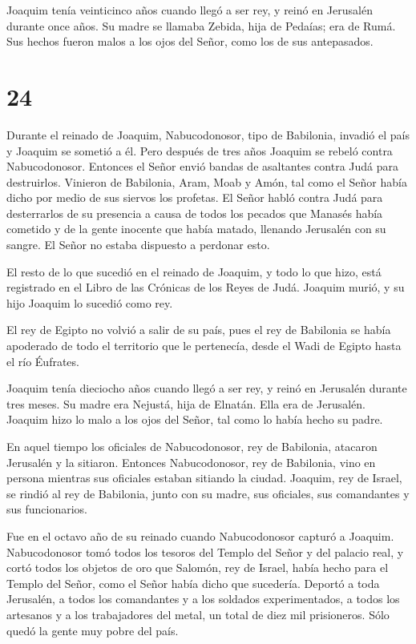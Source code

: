  Joaquim tenía veinticinco años cuando llegó a ser rey, y
reinó en Jerusalén durante once años. Su madre se llamaba Zebida, hija
de Pedaías; era de Rumá.  Sus hechos fueron malos a los
ojos del Señor, como los de sus antepasados.

\hypertarget{section-23}{%
\section{24}\label{section-23}}

 Durante el reinado de Joaquim, Nabucodonosor, tipo de
Babilonia, invadió el país y Joaquim se sometió a él. Pero después de
tres años Joaquim se rebeló contra Nabucodonosor.  Entonces
el Señor envió bandas de asaltantes contra Judá para destruirlos.
Vinieron de Babilonia, Aram, Moab y Amón, tal como el Señor había dicho
por medio de sus siervos los profetas.  El Señor habló
contra Judá para desterrarlos de su presencia a causa de todos los
pecados que Manasés había cometido y de la gente inocente que había
matado,  llenando Jerusalén con su sangre. El Señor no
estaba dispuesto a perdonar esto.

 El resto de lo que sucedió en el reinado de Joaquim, y todo
lo que hizo, está registrado en el Libro de las Crónicas de los Reyes de
Judá.  Joaquim murió, y su hijo Joaquim lo sucedió como rey.

 El rey de Egipto no volvió a salir de su país, pues el rey
de Babilonia se había apoderado de todo el territorio que le pertenecía,
desde el Wadi de Egipto hasta el río Éufrates.

 Joaquim tenía dieciocho años cuando llegó a ser rey, y
reinó en Jerusalén durante tres meses. Su madre era Nejustá, hija de
Elnatán. Ella era de Jerusalén.  Joaquim hizo lo malo a los
ojos del Señor, tal como lo había hecho su padre.

 En aquel tiempo los oficiales de Nabucodonosor, rey de
Babilonia, atacaron Jerusalén y la sitiaron.  Entonces
Nabucodonosor, rey de Babilonia, vino en persona mientras sus oficiales
estaban sitiando la ciudad.  Joaquim, rey de Israel, se
rindió al rey de Babilonia, junto con su madre, sus oficiales, sus
comandantes y sus funcionarios.

Fue en el octavo año de su reinado cuando Nabucodonosor capturó a
Joaquim.  Nabucodonosor tomó todos los tesoros del Templo
del Señor y del palacio real, y cortó todos los objetos de oro que
Salomón, rey de Israel, había hecho para el Templo del Señor, como el
Señor había dicho que sucedería.  Deportó a toda Jerusalén,
a todos los comandantes y a los soldados experimentados, a todos los
artesanos y a los trabajadores del metal, un total de diez mil
prisioneros. Sólo quedó la gente muy pobre del país.

